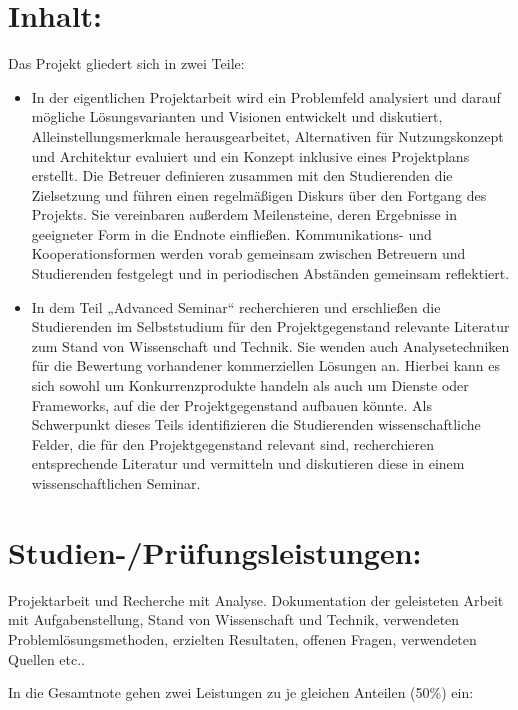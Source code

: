 \section*{Inhalt:}\label{inhalt-10}

Das Projekt gliedert sich in zwei Teile:

\begin{itemize}
\tightlist
\item
  In der eigentlichen Projektarbeit wird ein Problemfeld analysiert und
  darauf mögliche Lösungsvarianten und Visionen entwickelt und
  diskutiert, Alleinstellungsmerkmale herausgearbeitet, Alternativen für
  Nutzungskonzept und Architektur evaluiert und ein Konzept inklusive
  eines Projektplans erstellt. Die Betreuer definieren zusammen mit den
  Studierenden die Zielsetzung und führen einen regelmäßigen Diskurs
  über den Fortgang des Projekts. Sie vereinbaren außerdem Meilensteine,
  deren Ergebnisse in geeigneter Form in die Endnote einfließen.
  Kommunikations- und Kooperationsformen werden vorab gemeinsam zwischen
  Betreuern und Studierenden festgelegt und in periodischen Abständen
  gemeinsam reflektiert.
\item
  In dem Teil „Advanced Seminar`` recherchieren und erschließen die
  Studierenden im Selbststudium für den Projektgegenstand relevante
  Literatur zum Stand von Wissenschaft und Technik. Sie wenden auch
  Analysetechniken für die Bewertung vorhandener kommerziellen Lösungen
  an. Hierbei kann es sich sowohl um Konkurrenzprodukte handeln als auch
  um Dienste oder Frameworks, auf die der Projektgegenstand aufbauen
  könnte. Als Schwerpunkt dieses Teils identifizieren die Studierenden
  wissenschaftliche Felder, die für den Projektgegenstand relevant sind,
  recherchieren entsprechende Literatur und vermitteln und diskutieren
  diese in einem wissenschaftlichen Seminar.
\end{itemize}

\section*{Studien-/Prüfungsleistungen:}\label{studien-pruxfcfungsleistungen-10}

Projektarbeit und Recherche mit Analyse. Dokumentation der geleisteten
Arbeit mit Aufgabenstellung, Stand von Wissenschaft und Technik,
verwendeten Problemlösungsmethoden, erzielten Resultaten, offenen
Fragen, verwendeten Quellen etc..

In die Gesamtnote gehen zwei Leistungen zu je gleichen Anteilen (50\%)
ein:

